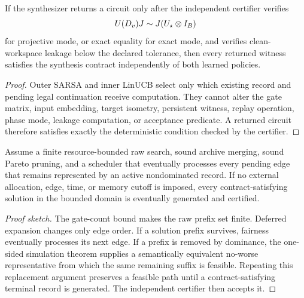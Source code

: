 \begin{theorem}
If the synthesizer returns a circuit only after the independent certifier verifies
\begin{equation}
U(D_v)J\mathrel{\sim} J(U_\star\otimes I_B)
\end{equation}
for projective mode, or exact equality for exact mode, and verifies clean-workspace leakage below the declared tolerance, then every returned witness satisfies the synthesis contract independently of both learned policies.
\end{theorem}
\begin{proof}
Outer SARSA and inner LinUCB select only which existing record and pending legal continuation receive computation. They cannot alter the gate matrix, input embedding, target isometry, persistent witness, replay operation, phase mode, leakage computation, or acceptance predicate. A returned circuit therefore satisfies exactly the deterministic condition checked by the certifier.
\end{proof}

\begin{theorem}
Assume a finite resource-bounded raw search, sound archive merging, sound Pareto pruning, and a scheduler that eventually processes every pending edge that remains represented by an active nondominated record. If no external allocation, edge, time, or memory cutoff is imposed, every contract-satisfying solution in the bounded domain is eventually generated and certified.
\end{theorem}
\begin{proof}[Proof sketch]
The gate-count bound makes the raw prefix set finite. Deferred expansion changes only edge order. If a solution prefix survives, fairness eventually processes its next edge. If a prefix is removed by dominance, the one-sided simulation theorem supplies a semantically equivalent no-worse representative from which the same remaining suffix is feasible. Repeating this replacement argument preserves a feasible path until a contract-satisfying terminal record is generated. The independent certifier then accepts it.
\end{proof}



